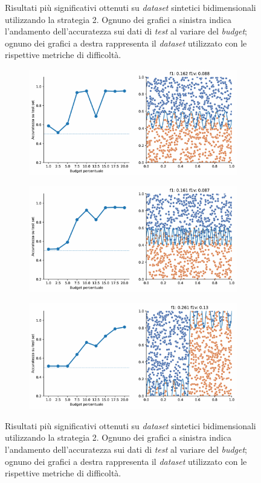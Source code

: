 \begin{figure}[b!]
\begin{subfigure}{\textwidth}
    \end{subfigure}
    \caption[Risultati su \emph{dataset} sintetici utilizzando la strategia 2.]{Risultati più significativi ottenuti su \emph{dataset} sintetici bidimensionali utilizzando la strategia 2. Ognuno dei grafici a sinistra indica l'andamento dell'accuratezza sui dati di \emph{test} al variare del \emph{budget}; ognuno dei grafici a destra rappresenta il \emph{dataset} utilizzato con le rispettive metriche di difficoltà.}
\end{figure}
\begin{figure}[ht]\ContinuedFloat
    \begin{subfigure}{\textwidth}
        \centering
        \includegraphics[width=.8\textwidth]{img/2d_v2/13.pdf}
    \end{subfigure}%
    \hfill
    \begin{subfigure}{\textwidth}
        \centering
        \includegraphics[width=.8\textwidth]{img/2d_v2/14.pdf}
    \end{subfigure}
    \hfill
    \begin{subfigure}{\textwidth}
        \centering
        \includegraphics[width=.8\textwidth]{img/2d_v2/15.pdf}
    \end{subfigure}%
\caption[]{Risultati più significativi ottenuti su \emph{dataset} sintetici bidimensionali utilizzando la strategia 2. Ognuno dei grafici a sinistra indica l'andamento dell'accuratezza sui dati di \emph{test} al variare del \emph{budget}; ognuno dei grafici a destra rappresenta il \emph{dataset} utilizzato con le rispettive metriche di difficoltà.}
\label{fig:2d_v2}
\end{figure}
